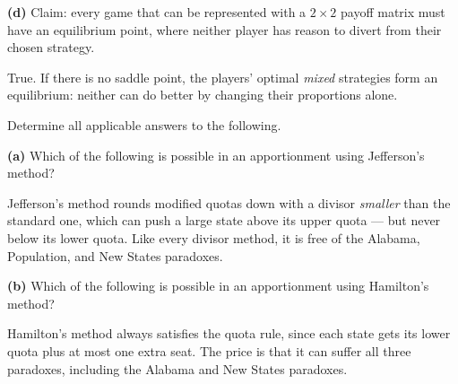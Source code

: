 \documentclass[12pt]{ximera}
\begin{document}
\begin{problem}
\begin{prompt}
\textbf{(d)} Claim: every game that can be represented with a $2\times 2$ payoff matrix
must have an equilibrium point, where neither player has reason to divert from their
chosen strategy.

\begin{multipleChoice}
\end{multipleChoice}

\begin{feedback}
True. If there is no saddle point, the players' optimal \emph{mixed} strategies form an
equilibrium: neither can do better by changing their proportions alone.
\end{feedback}
\end{prompt}
\end{problem}

\begin{problem}
Determine all applicable answers to the following.

\begin{prompt}
\textbf{(a)} Which of the following is possible in an apportionment using Jefferson's
method?

\begin{selectAll}
\end{selectAll}

\begin{feedback}
Jefferson's method rounds modified quotas down with a divisor \emph{smaller} than the
standard one, which can push a large state above its upper quota --- but never below its
lower quota. Like every divisor method, it is free of the Alabama, Population, and New
States paradoxes.
\end{feedback}
\end{prompt}

\begin{prompt}
\textbf{(b)} Which of the following is possible in an apportionment using Hamilton's
method?

\begin{selectAll}
\end{selectAll}

\begin{feedback}
Hamilton's method always satisfies the quota rule, since each state gets its lower quota
plus at most one extra seat. The price is that it can suffer all three paradoxes,
including the Alabama and New States paradoxes.
\end{feedback}
\end{prompt}
\end{problem}
\end{document}
